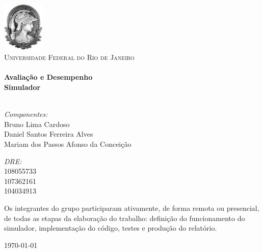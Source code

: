 \begin{titlepage}

\begin{center}

\includegraphics[width=0.15\textwidth]{./logo.jpeg}\\[1cm]

\textsc{\LARGE Universidade Federal do Rio de Janeiro}\\[1.5cm]


\HRule \\[0.4cm]
{ \huge \bfseries Avaliação e Desempenho }\\[0.4cm]
{ \huge \bfseries Simulador} \\[0.4cm]
\HRule \\[1.5cm]


\begin{minipage}{0.6\textwidth}
  \begin{flushleft} 
  \emph{Componentes:}\\
  Bruno Lima Cardoso \\
  Daniel Santos Ferreira Alves \\
  Mariam dos Passos Afonso da Conceição
  \end{flushleft}
\end{minipage}
\begin{minipage}{0.3\textwidth}
  \begin{flushright}
  \emph{DRE:} \\
  108055733 \\
  107362161 \\
  104034913
  \end{flushright}
\end{minipage}

\vfill

\begin{minipage}{0.8\textwidth}
  Os integrantes do grupo participaram ativamente, de forma remota ou presencial, de todas as etapas da elaboração do trabalho: definição do funcionamento do simulador, implementação do código, testes e produção do relatório.
\end{minipage}

\vfill


{\large \today}

\end{center}

\end{titlepage}